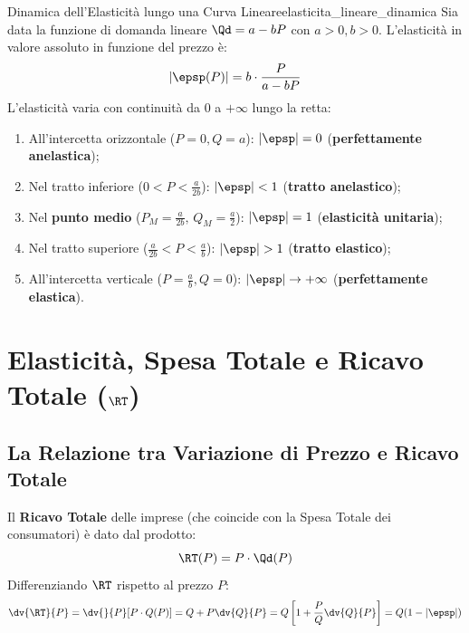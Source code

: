 \begin{teorema}{Dinamica dell'Elasticità lungo una Curva Lineare}{elasticita_lineare_dinamica}
Sia data la funzione di domanda lineare $\Qd = a - bP$ con $a > 0, b > 0$.
L'elasticità in valore assoluto in funzione del prezzo è:
\begin{equation}
    |\epsp(P)| = b \cdot \frac{P}{a - bP}
\end{equation}
L'elasticità varia con continuità da $0$ a $+\infty$ lungo la retta:
\begin{enumerate}
    \item All'intercetta orizzontale ($P = 0, Q = a$): $|\epsp| = 0$ (\textbf{perfettamente anelastica});
    \item Nel tratto inferiore ($0 < P < \frac{a}{2b}$): $|\epsp| < 1$ (\textbf{tratto anelastico});
    \item Nel \textbf{punto medio} ($P_M = \frac{a}{2b}, \, Q_M = \frac{a}{2}$): $|\epsp| = 1$ (\textbf{elasticità unitaria});
    \item Nel tratto superiore ($\frac{a}{2b} < P < \frac{a}{b}$): $|\epsp| > 1$ (\textbf{tratto elastico});
    \item All'intercetta verticale ($P = \frac{a}{b}, Q = 0$): $|\epsp| \to +\infty$ (\textbf{perfettamente elastica}).
\end{enumerate}
\end{teorema}

\section{Elasticità, Spesa Totale e Ricavo Totale ($\RT$)}

\subsection{La Relazione tra Variazione di Prezzo e Ricavo Totale}
Il \textbf{Ricavo Totale} delle imprese (che coincide con la Spesa Totale dei consumatori) è dato dal prodotto:
\begin{equation}
    \RT(P) = P \cdot \Qd(P)
\end{equation}
Differenziando $\RT$ rispetto al prezzo $P$:
\begin{equation}
    \dv{\RT}{P} = \dv{}{P}[P \cdot Q(P)] = Q + P \dv{Q}{P} = Q \left[ 1 + \frac{P}{Q} \dv{Q}{P} \right] = Q(1 - |\epsp|)
\end{equation}

